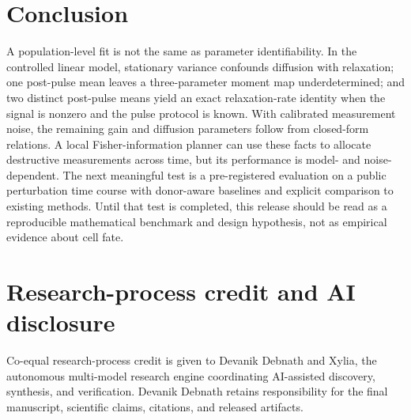 \documentclass[11pt,a4paper]{article}
\begin{document}
\section{Conclusion}
A population-level fit is not the same as parameter identifiability. In the controlled linear model, stationary variance confounds diffusion with relaxation; one post-pulse mean leaves a three-parameter moment map underdetermined; and two distinct post-pulse means yield an exact relaxation-rate identity when the signal is nonzero and the pulse protocol is known. With calibrated measurement noise, the remaining gain and diffusion parameters follow from closed-form relations. A local Fisher-information planner can use these facts to allocate destructive measurements across time, but its performance is model- and noise-dependent. The next meaningful test is a pre-registered evaluation on a public perturbation time course with donor-aware baselines and explicit comparison to existing methods. Until that test is completed, this release should be read as a reproducible mathematical benchmark and design hypothesis, not as empirical evidence about cell fate.
\section*{Research-process credit and AI disclosure}
Co-equal research-process credit is given to Devanik Debnath and Xylia, the autonomous multi-model research engine coordinating AI-assisted discovery, synthesis, and verification. Devanik Debnath retains responsibility for the final manuscript, scientific claims, citations, and released artifacts.


\end{document}
